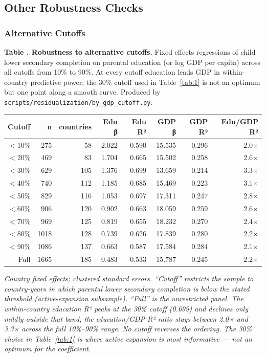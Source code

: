 \documentclass[12pt,letterpaper]{article}
\begin{document}
{%

\subsection{Other Robustness Checks}\label{robustness}

\subsubsection{Alternative Cutoffs}\label{appendix-cutoffs}

\label{tab:cutoff-full}\textbf{Table \thetable. Robustness to alternative cutoffs.}
Fixed effects regressions of child lower secondary completion on parental
education (or log GDP per capita) across all cutoffs from 10\% to 90\%.
At every cutoff education leads GDP in within-country predictive power;
the 30\% cutoff used in Table~\ref{tab:1} is not an optimum but one point
along a smooth curve. Produced by
\texttt{scripts/residualization/by\_gdp\_cutoff.py}.

\begin{longtable}[]{@{}rrrrrrrr@{}}
\toprule
Cutoff & n & countries & Edu β & Edu R² & GDP β & GDP R² & Edu/GDP R² \\
\midrule
\endhead
$<$10\% & 275  & 58  & 2.022 & 0.590 & 15.535 & 0.296 & 2.0× \\
$<$20\% & 469  & 83  & 1.704 & 0.665 & 15.502 & 0.258 & 2.6× \\
$<$30\% & 629  & 105 & 1.376 & 0.699 & 13.659 & 0.214 & 3.3× \\
$<$40\% & 740  & 112 & 1.185 & 0.685 & 15.469 & 0.223 & 3.1× \\
$<$50\% & 829  & 116 & 1.053 & 0.697 & 17.311 & 0.247 & 2.8× \\
$<$60\% & 906  & 120 & 0.902 & 0.663 & 18.059 & 0.259 & 2.6× \\
$<$70\% & 969  & 125 & 0.819 & 0.655 & 18.232 & 0.270 & 2.4× \\
$<$80\% & 1018 & 128 & 0.739 & 0.626 & 17.839 & 0.280 & 2.2× \\
$<$90\% & 1086 & 137 & 0.663 & 0.587 & 17.584 & 0.284 & 2.1× \\
Full  & 1665 & 185 & 0.483 & 0.533 & 15.787 & 0.245 & 2.2× \\
\bottomrule
\end{longtable}

\emph{Country fixed effects; clustered standard errors. ``Cutoff'' restricts
the sample to country-years in which parental lower secondary completion
is below the stated threshold (active-expansion subsample). ``Full'' is
the unrestricted panel. The within-country education R² peaks at the
30\% cutoff (0.699) and declines only mildly outside that band; the
education/GDP R² ratio stays between 2.0× and 3.3× across the full 10\%--90\%
range. No cutoff reverses the ordering. The 30\% choice in
Table~\ref{tab:1} is where active expansion is most informative --- not
an optimum for the coefficient.}

}
\end{document}
